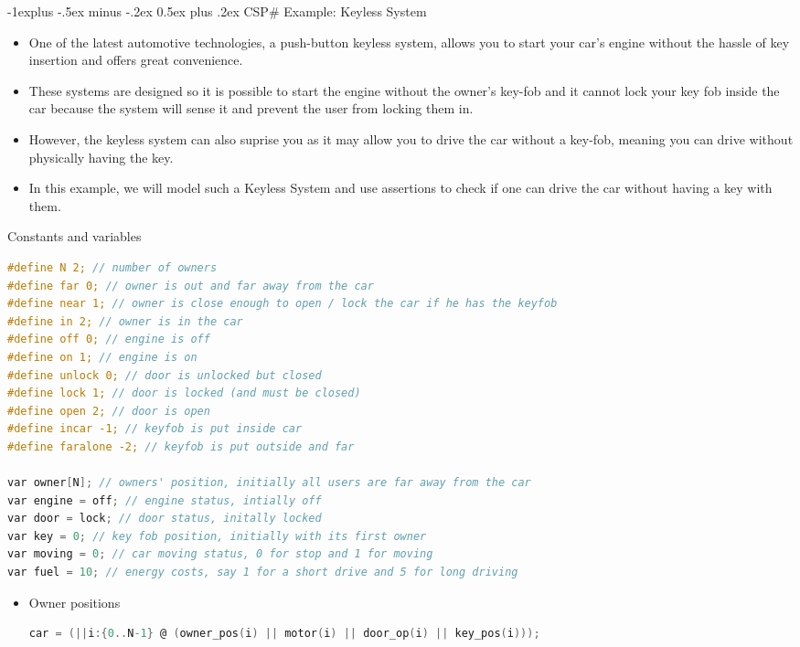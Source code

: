 \documentclass[10pt, landscape]{article}
\makeatletter
\renewcommand{\subsection}{\@startsection{subsection}{2}{0mm}%
  {-1explus -.5ex minus -.2ex}%
  {0.5ex plus .2ex}%
{\normalfont\normalsize\bfseries}}
\makeatother
\begin{document}
\begin{multicols*}{2}
  \subsection{CSP\# Example: Keyless System}
  \begin{itemize}
      \item One of the latest automotive technologies, a push-button keyless system, allows you to start your car's engine without the hassle of key insertion and offers great convenience.
      \item These systems are designed so it is possible to start the engine without the owner's key-fob and it cannot lock your key fob inside the car because the system will sense it and prevent the user from locking them in.
      \item \color{red} However, the keyless system can also suprise you as it may allow you to drive the car without a key-fob, meaning you can drive without physically having the key.
      \item In this example, we will model such a Keyless System and use assertions to check if one can drive the car without having a key with them.
  \end{itemize}

  Constants and variables
\begin{lstlisting}[language=C, basicstyle=\scriptsize\selectfont\ttfamily, mathescape]
#define N 2; // number of owners
#define far 0; // owner is out and far away from the car
#define near 1; // owner is close enough to open / lock the car if he has the keyfob
#define in 2; // owner is in the car
#define off 0; // engine is off
#define on 1; // engine is on
#define unlock 0; // door is unlocked but closed
#define lock 1; // door is locked (and must be closed)
#define open 2; // door is open
#define incar -1; // keyfob is put inside car
#define faralone -2; // keyfob is put outside and far

var owner[N]; // owners' position, initially all users are far away from the car
var engine = off; // engine status, intially off
var door = lock; // door status, initally locked
var key = 0; // key fob position, initially with its first owner
var moving = 0; // car moving status, 0 for stop and 1 for moving
var fuel = 10; // energy costs, say 1 for a short drive and 5 for long driving
\end{lstlisting}


  \begin{itemize}
    \item Owner positions
\begin{lstlisting}[language=C, basicstyle=\scriptsize\selectfont\ttfamily, mathescape]
car = (||i:{0..N-1} @ (owner_pos(i) || motor(i) || door_op(i) || key_pos(i)));


\end{lstlisting}
\end{itemize}
\end{multicols*}
\end{document}
